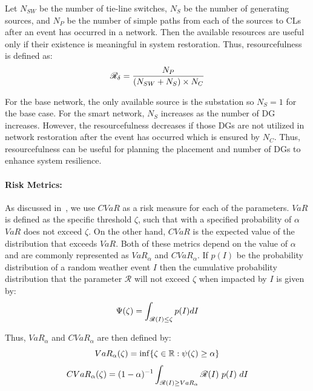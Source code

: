 \documentclass[hidelinks, 12pt]{article}
\begin{document}
Let $N_{SW}$ be the number of tie-line switches, $N_S$ be the number of generating sources, and $N_P$ be the number of simple paths from each of the sources to CLs after an event has occurred in a network. Then the available resources are useful only if their existence is meaningful in system restoration. Thus, resourcefulness is defined as:
\vspace{-3pt}
\begin{equation} \small
    \mathcal{R}_\delta = \frac{N_P}{(N_{SW} + N_S) \times N_C}
    \label{eq:resourcefulness}
\end{equation}

For the base network, the only available source is the substation so $N_{S} = 1$ for the base case. For the smart network, $N_{S}$ increases as the number of DG increases. However, the resourcefulness decreases if those DGs are not utilized in network restoration after the event has occurred which is ensured by $N_C$. Thus, resourcefulness can be useful for planning the placement and number of DGs to enhance system resilience.

\paragraph{Risk Metrics:}

As discussed in~\cite{poudel2019risk}, we use $CVaR$ as a risk measure for each of the parameters. $VaR$ is defined as the specific threshold $\zeta$, such that with a specified probability of $\alpha$ $VaR$ does not exceed $\zeta$. On the other hand, $CVaR$ is the expected value of the distribution that exceeds $VaR$. Both of these metrics depend on the value of $\alpha$ and are commonly represented as $VaR_\alpha$ and $CVaR_\alpha$. If $p(I)$ be the probability distribution of a random weather event $I$ then the cumulative probability distribution that the parameter $\mathcal{R}$ will not exceed $\zeta$ when impacted by $I$ is given by:
\vspace{-5pt}
\begin{equation} \small
    \Psi (\zeta) = \int_{\mathcal{R}(I)\leq \zeta }^{} p(I) dI
\end{equation}

\noindent Thus, $VaR_\alpha$ and $CVaR_\alpha$ are then defined by:
\vspace{-5pt}
\begin{equation} \small
    VaR_\alpha (\zeta) = \inf\{\zeta \in \mathbb{R}:\psi(\zeta)\geq \alpha\}
    \label{eq:var}
\end{equation}
\vspace{-10pt}
\begin{equation} \small
    CVaR_{\alpha} (\zeta) = (1-\alpha)^{-1}\int_{\mathcal{R}(I)\geq VaR_{\alpha} }^{} \mathcal{R}(I)\ p(I)\ dI
    \label{eq:cvar}
\end{equation}
\end{document}

